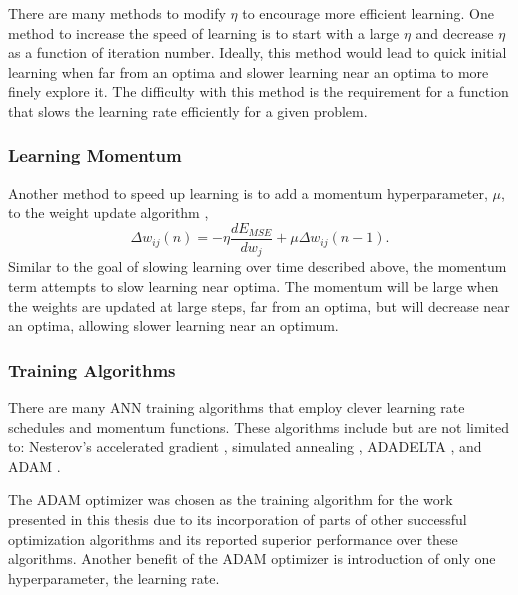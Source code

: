 There are many methods to modify $\eta$ to encourage more efficient learning. One method to increase the speed of learning is to start with a large $\eta$ and decrease $\eta$ as a function of iteration number. Ideally, this method would lead to quick initial learning when far from an optima and slower learning near an optima to more finely explore it. The difficulty with this method is the requirement for a function that slows the learning rate efficiently for a given problem.

\subsubsection{Learning Momentum}

Another method to speed up learning is to add a momentum hyperparameter, $\mu$, to the weight update algorithm \cite{Yu1997}, 
%
\begin{equation} \label{eq:update_momentum}
\Delta w_{ij}(n) = - \eta \frac{dE_{MSE}}{dw_j} +\mu \Delta w_{ij}(n-1).
\end{equation}
%
Similar to the goal of slowing learning over time described above, the momentum term attempts to slow learning near optima. The momentum will be large when the weights are updated at large steps, far from an optima, but will decrease near an optima, allowing slower learning near an optimum.
 
\subsubsection{Training Algorithms}

There are many ANN training algorithms that employ clever learning rate schedules and momentum functions. These algorithms include but are not limited to: Nesterov's accelerated gradient \cite{nesterov1983}, simulated annealing \cite{Kirkpatrick1983}, ADADELTA \cite{ADADELTA}, and ADAM \cite{Kingma2015}. 

The ADAM optimizer was chosen as the training algorithm for the work presented in this thesis due to its incorporation of parts of other successful optimization algorithms and its reported superior performance over these algorithms. Another benefit of the ADAM optimizer is introduction of only one hyperparameter, the learning rate. 

